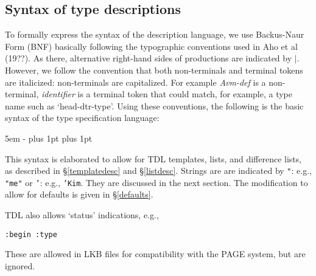 \documentclass[12pt]{report}
\begin{document}
\subsection{Syntax of type descriptions}
\label{bnftype}

To formally express the syntax of the description language, we
use Backus-Naur Form (BNF) basically following the typographic conventions used
in Aho et al (19??).
As there, alternative right-hand sides of productions are indicated by
$|$.  
However, we follow the convention that both non-terminals and
terminal tokens are italicized: non-terminals are capitalized.
For example {\it Avm-def} is a non-terminal, {\it identifier}
is a terminal token that could match, for example, a type name
such as `head-dtr-type'.
Using these conventions, the following is the basic
syntax of the type specification 
language:
\begin{list}{}
   {\leftmargin 5em
    \itemindent -\leftmargin
    \itemsep 0pt plus 1pt
    \parsep 0pt plus 1pt}
\end{list}
This syntax is elaborated to allow for 
TDL templates, lists, and difference lists,
as described in \S\ref{templatedesc} and \S\ref{listdesc}.  Strings are 
are indicated by
{\tt "}: e.g., {\tt "me"} or {\tt '}: e.g.,  {\tt 'Kim}.  They are
discussed in the next section.  The modification to allow
for defaults is given in \S\ref{defaults}.

TDL also allows `status' indications, e.g.,
\begin{verbatim}
:begin :type
\end{verbatim}
These are allowed in LKB files for compatibility with the PAGE
system, but are ignored.  
\end{document}
